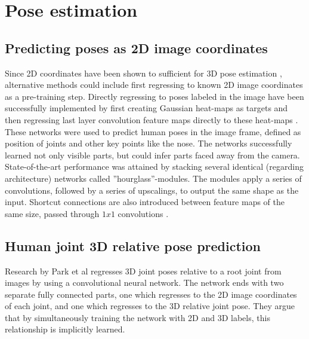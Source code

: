 \section{Pose estimation}

\subsection{Predicting poses as 2D image coordinates}

Since 2D coordinates have been shown to sufficient for 3D pose estimation
\cite{chebotar2016path}, alternative methods could include first regressing to
known 2D image coordinates as a pre-training step. Directly regressing to poses
labeled in the image have been successfully implemented by first creating
Gaussian heat-maps as targets and then regressing last layer convolution
feature maps directly to these heat-maps
\cite{newell2016stacked,tompson2014joint}. These networks were used to predict
human poses in the image frame, defined as position of joints and other key
points like the nose. The networks successfully learned not only visible parts,
but could infer parts faced away from the camera.  State-of-the-art performance
was attained by stacking several identical (regarding architecture) networks
called ''hourglass''-modules. The modules apply a series of convolutions,
followed by a series of upscalings, to output the same shape as the input.
Shortcut connections are also introduced between feature maps of the same size,
passed through $1x1$ convolutions \cite{newell2016stacked}.

\subsection{Human joint 3D relative pose prediction}

Research by Park et al \cite{park20163d} regresses 3D joint poses relative to a
root joint from images by using a convolutional neural network. The network
ends with two separate fully connected parts, one which regresses to the 2D
image coordinates of each joint, and one which regresses to the 3D relative
joint pose. They argue that by simultaneously training the network with 2D and
3D labels, this relationship is implicitly learned.

